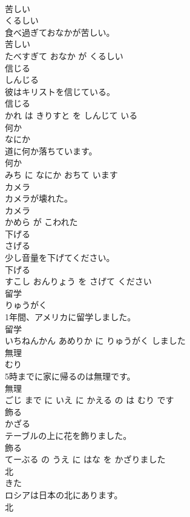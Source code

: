 \documentclass[8pt]{extreport}
\begin{document}
\begin{CJK}{UTF8}{min}
\\	苦しい	
\\	くるしい			
\\	食べ過ぎておなかが苦しい。	
\\	苦しい 
\\	たべすぎて おなか が くるしい			
\\	信じる	
\\	しんじる			
\\	彼はキリストを信じている。	
\\	信じる 
\\	かれ は きりすと を しんじて いる			
\\	何か	
\\	なにか			
\\	道に何か落ちています。	
\\	何か 
\\	みち に なにか おちて います			
\\	カメラ	
\\	カメラが壊れた。	
\\	カメラ 
\\	かめら が こわれた			
\\	下げる	
\\	さげる			
\\	少し音量を下げてください。	
\\	下げる 
\\	すこし おんりょう を さげて ください			
\\	留学	
\\	りゅうがく			
\\	1年間、アメリカに留学しました。	
\\	留学 
\\	いちねんかん あめりか に りゅうがく しました			
\\	無理	
\\	むり			
\\	5時までに家に帰るのは無理です。	
\\	無理 
\\	ごじ まで に いえ に かえる の は むり です			
\\	飾る	
\\	かざる			
\\	テーブルの上に花を飾りました。	
\\	飾る 
\\	てーぶる の うえ に はな を かざりました			
\\	北	
\\	きた			
\\	ロシアは日本の北にあります。	
\\	北 

\end{CJK}
\end{document}
